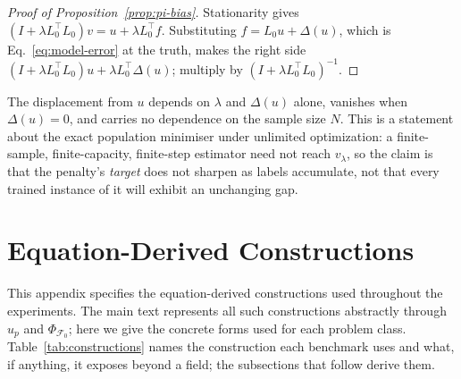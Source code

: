 \documentclass{article}
\begin{document}
\begin{proof}[Proof of Proposition~\ref{prop:pi-bias}]
Stationarity gives $\left(I+\lambda L_0^{\top}L_0\right)v=u+\lambda L_0^{\top}f$.
Substituting $f=L_0u+\Delta(u)$, which is Eq.~\ref{eq:model-error} at the truth, makes the right side
$\left(I+\lambda L_0^{\top}L_0\right)u+\lambda L_0^{\top}\Delta(u)$; multiply by
$\left(I+\lambda L_0^{\top}L_0\right)^{-1}$.
\end{proof}

\noindent
The displacement from $u$ depends on $\lambda$ and $\Delta(u)$ alone, vanishes when
$\Delta(u)=0$, and carries no dependence on the sample size $N$. This is a statement about
the exact population minimiser under unlimited optimization: a finite-sample,
finite-capacity, finite-step estimator need not reach $v_\lambda$, so the claim is that the
penalty's \emph{target} does not sharpen as labels accumulate, not that every trained
instance of it will exhibit an unchanging gap.

\section{Equation-Derived Constructions}
\label{app:priors}

This appendix specifies the equation-derived constructions used throughout the
experiments. The main text represents all such constructions abstractly through
$u_p$ and $\Phi_{\mathcal F_0}$; here we give the concrete forms used for each
problem class. Table~\ref{tab:constructions} names the construction each benchmark
uses and what, if anything, it exposes beyond a field; the subsections that follow
derive them.
\end{document}
